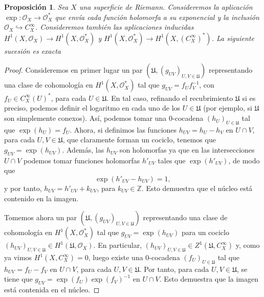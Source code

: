\documentclass[12pt,a4paper]{article}
\newtheorem{prop}[thm]{Proposición}
\theoremstyle{definition} \newtheorem{defn}[thm]{Definición}
\theoremstyle{definition} \newtheorem{ejemplo}[thm]{Ejemplo}
\theoremstyle{definition} \newtheorem{ejercicio}[thm]{Ejercicio}
\def\OO{\mathscr{O}}
\def\UU{\mathfrak{U}}
\begin{document}
	  \begin{prop}
	    Sea $X$ una superficie de Riemann. Consideremos la aplicación $\exp:\OO_X \rightarrow \OO_X^*$ que envía cada función holomorfa a su exponencial y la inclusión $\OO_X\hookrightarrow C^\infty_X$. Consideremos también las aplicaciones inducidas $H^1(X,\OO_X)\rightarrow H^1(X,\OO_X^*)$ y $H^1(X,\OO_X^*)\rightarrow H^1(X,(C^\infty_X)^*)$. La siguiente sucesión es exacta
	    \begin{center}
	    \end{center}
	  \end{prop}
	  \begin{proof}
	    Consideremos en primer lugar un par $(\UU,(g_{UV})_{U,V\in \UU})$ representando una clase de cohomología en $H^1(X,\OO_X^*)$ tal que $g_{UV}=f_U f_V^{-1}$, con $f_U \in C^\infty_X(U)^*$, para cada $U\in \UU$. En tal caso, refinando el recubrimiento $\UU$ si es preciso, podemos definir el logaritmo en cada uno de los $U\in \UU$ (por ejemplo, si $\UU$ son simplemente conexos). Así, podemos tomar una $0$-cocadena $(h_{U})_{U \in \UU}$ tal que $\exp(h_{U})=f_U$. Ahora, si definimos las funciones $h_{UV} = h_U - h_V$ en $U\cap V$, para cada $U,V \in \UU$, que claramente forman un cociclo, tenemos que $g_{UV} = \exp(h_{UV})$. Además, las $h_{UV}$ son holomorfas ya que en las intersecciones $U\cap V$ podemos tomar funciones holomorfas $h'_{UV}$ tales que $\exp(h'_{UV})$, de modo que 
	    \begin{equation*}
	      \exp(h'_{UV} - h_{UV}) = 1,
	    \end{equation*}
	    y por tanto, $h_{UV} = h'_{UV} + k_{UV}$, para $k_{UV} \in \mathbb{Z}$.
	    Esto demuestra que el núcleo está contenido en la imagen.

	    Tomemos ahora un par $(\UU,(g_{UV})_{U,V \in \UU})$ representando una clase de cohomología en $H^1(X,\OO_X^*)$ tal que $g_{UV}=\exp(h_{UV})$ para un cociclo $(h_{UV})_{U,V \in \UU} \in H^1(\UU,\OO_X)$. En particular, $(h_{UV})_{U,V \in \UU} \in Z^1(\UU,C^\infty_X)$ y, como ya vimos $H^1(X,C^\infty_X) =0$, luego existe una $0$-cocadena $(f_{U})_{U\in \UU}$ tal que $h_{UV}=f_U-f_V$ en $U\cap V$, para cada $U,V \in \UU$. Por tanto, para cada $U,V \in \UU$, se tiene que $g_{UV}= \exp(f_U) \exp(f_V)^{-1}$ en $U\cap V$. Esto demuestra que la imagen está contenida en el núcleo.
	  \end{proof}
\end{document}
